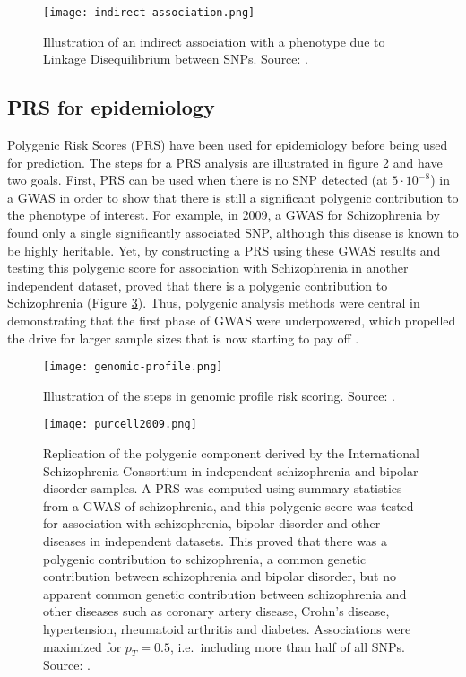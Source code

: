 \begin{figure}[htb]
\centerline{\texttt{[image: indirect-association.png]}}
\caption{Illustration of an indirect association with a phenotype due to Linkage Disequilibrium between SNPs. Source: \cite{astle2009population}.}\label{fig:gwasLD}
\end{figure}

\subsection{PRS for epidemiology}

Polygenic Risk Scores (PRS) have been used for epidemiology before being used for prediction. The steps for a PRS analysis are illustrated in figure \ref{fig:steps-PRS} and have two goals. 
First, PRS can be used when there is no SNP detected (at $5 \cdot 10^{-8}$) in a GWAS in order to show that there is still a significant polygenic contribution to the phenotype of interest. 
For example, in 2009, a GWAS for Schizophrenia by \cite{purcell2009common} found only a single significantly associated SNP, although this disease is known to be highly heritable. Yet, by constructing a PRS using these GWAS results and testing this polygenic score for association with Schizophrenia in another independent dataset, \cite{purcell2009common} proved that there is a polygenic contribution to Schizophrenia (Figure \ref{fig:epi-PRS}). 
Thus, polygenic analysis methods were central in demonstrating that the first phase of GWAS were underpowered, which propelled the drive for larger sample sizes that is now starting to pay off \cite[]{wray2014research}.

\begin{figure}[htb]
\centerline{\texttt{[image: genomic-profile.png]}}
\caption{Illustration of the steps in genomic profile risk scoring. Source: \cite{wray2014research}.}\label{fig:steps-PRS}
\end{figure}

\begin{figure}[htb]
\centerline{\texttt{[image: purcell2009.png]}}
\caption{Replication of the polygenic component derived by the International Schizophrenia Consortium in independent schizophrenia and bipolar disorder samples. A PRS was computed using summary statistics from a GWAS of schizophrenia, and this polygenic score was tested for association with schizophrenia, bipolar disorder and other diseases in independent datasets. This proved that there was a polygenic contribution to schizophrenia, a common genetic contribution between schizophrenia and bipolar disorder, but no apparent common genetic contribution between schizophrenia and other diseases such as coronary artery disease, Crohn's disease, hypertension, rheumatoid arthritis and diabetes. Associations were maximized for $p_T = 0.5$, i.e.\ including more than half of all SNPs. Source: \cite{purcell2009common}.}\label{fig:epi-PRS}
\end{figure}

